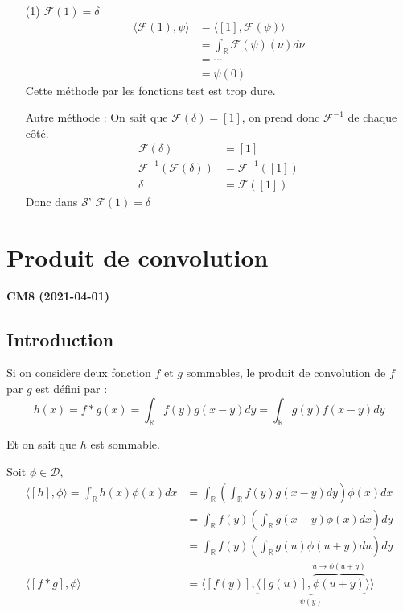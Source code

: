 \documentclass[12pt,a4paper]{report}
\newcommand{\ens}[1]{\ensuremath{\mathbb{#1}}}
\newcommand{\D}{\ensuremath{\mathcal{D}}}
\newcommand{\F}{\ensuremath{\mathcal{F}}}
\newcommand{\Sf}{\ensuremath{\mathcal{S}}}
\begin{document}
\begin{itemize}
	\item[(1)] \(\F(1) = \delta\)
	\begin{align*}
		\langle \F(1), \psi \rangle &= \langle [1], \F(\psi) \rangle\\
		&= \int_{\ens{R}} \F(\psi)(\nu) d\nu\\
		&= \cdots\\
		&= \psi(0)
	\end{align*}
	Cette méthode par les fonctions test est trop dure.
	
	Autre méthode : On sait que \(\F(\delta) = [1]\), on prend donc \(\F^{-1}\) de chaque côté.
	\begin{align*}
		\F(\delta) &= [1]\\
		\F^{-1}(\F(\delta)) &= \F^{-1}([1])\\
		\delta &= \F([1])
	\end{align*}
	Donc dans \Sf' \(\F(1) = \delta\)
\end{itemize}

\chapter{Produit de convolution}

\begin{center}
\textbf{CM8 (2021-04-01)}
\end{center}

\section{Introduction}

Si on considère deux fonction \(f\) et \(g\) sommables, le produit de convolution de \(f\) par \(g\) est défini par :
\[
	h(x) = f*g(x) = \int_{\ens{R}} f(y) g(x-y)dy = \int_\ens{R} g(y) f(x-y)dy
\]

Et on sait que \(h\) est sommable.

Soit \(\phi \in \D\),
\begin{align*}
	\langle [h], \phi \rangle = \int_{\ens{R}} h(x) \phi(x) dx &= \int_\ens{R}\left (\int_\ens{R} f(y) g(x-y) dy \right ) \phi(x) dx\\
	&= \int_\ens{R}f(y) \left ( \int_\ens{R} g(x-y) \phi(x) dx \right ) dy\\
	&= \int_\ens{R} f(y)\left ( \int_\ens{R} g(u) \phi(u+y) du\right ) dy\\
	\langle [f*g], \phi \rangle &= \langle [f(y)], \underbrace{\langle [g(u)],\overbrace{\phi(u+y)}^{u\rightarrow \phi(u+y)}}_{\psi(y)}\rangle\rangle
\end{align*}
\end{document}
